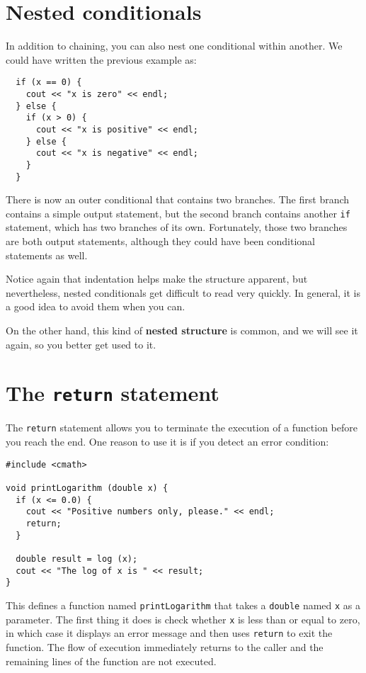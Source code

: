 \section{Nested conditionals}

In addition to chaining, you can also nest one conditional
within another.  We could have written the previous example
as:

\begin{lstlisting}
  if (x == 0) {
    cout << "x is zero" << endl;
  } else {
    if (x > 0) {
      cout << "x is positive" << endl;
    } else {
      cout << "x is negative" << endl;
    }
  }
\end{lstlisting}
%
There is now an outer conditional that contains two branches.  The
first branch contains a simple output statement, but the second
branch contains another {\tt if} statement, which has two branches
of its own.  Fortunately, those two branches are both output
statements, although they could have been conditional statements as
well.

Notice again that indentation helps make the structure
apparent, but nevertheless, nested conditionals get difficult to read
very quickly.  In general, it is a good idea to avoid them when you
can.


On the other hand, this kind of {\bf nested structure} is common, and
we will see it again, so you better get used to it.

\section{The {\tt return} statement}

The {\tt return} statement allows you to terminate the execution
of a function before you reach the end.  One reason to use it
is if you detect an error condition:

\begin{lstlisting}
#include <cmath>

void printLogarithm (double x) {
  if (x <= 0.0) {
    cout << "Positive numbers only, please." << endl;
    return;
  }

  double result = log (x);
  cout << "The log of x is " << result;
}
\end{lstlisting}
%
This defines a function named {\tt printLogarithm} that takes
a {\tt double} named {\tt x} as a parameter.  The first thing
it does is check whether {\tt x} is less than or equal to
zero, in which case it displays an error message and then uses
{\tt return} to exit the function.  The flow of execution
immediately returns to the caller and the remaining lines of
the function are not executed.

